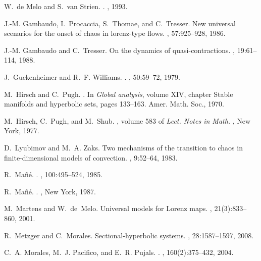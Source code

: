 \documentclass[reqno,12pt,a4paper]{amsart}
\theoremstyle{plain}
\theoremstyle{definition}
\begin{document}
\begin{thebibliography}{10}
W.~{de Melo} and S.~{van Strien}.
.
, {1993}.

J.-M. Gambaudo, I.~Procaccia, S.~Thomae, and C.~Tresser.
\newblock New universal scenarios for the onset of chaos in lorenz-type flows.
, 57:925--928, 1986.

J.-M. Gambaudo and C.~Tresser.
\newblock On the dynamics of quasi-contractions.
, 19:61--114, 1988.

J.~Guckenheimer and R.~F. Williams.
.
, {50}:{59--72}, {1979}.

M.~Hirsch and C.~Pugh.
.
\newblock In {\em {Global analysis}}, volume {XIV}, chapter {Stable manifolds
  and hyperbolic sets}, pages {133--163}. {Amer. Math. Soc.}, {1970}.

M.~Hirsch, C.~Pugh, and M.~Shub.
, volume {583} of {\em {Lect. Notes in
  Math.}}
, {New York}, {1977}.

D.~Lyubimov and M.~A. Zaks.
\newblock Two mechanisms of the transition to chaos in finite-dimensional
  models of convection.
, 9:52--64, 1983.

R.~Ma{\~n}{\'e}.
.
, {100}:{495--524}, {1985}.

R.~Ma{\~n}{\'e}.
.
, {New York}, {1987}.

M.~Martens and W.~de~Melo.
\newblock Universal models for {L}orenz maps.
, 21(3):833--860, 2001.

R.~Metzger and C.~Morales.
\newblock Sectional-hyperbolic systems.
, 28:1587--1597, 2008.

C.~A. Morales, M.~J. Pacifico, and E.~R. Pujals.
.
, {160}({2}):{375--432}, {2004}.


\end{thebibliography}
\end{document}
